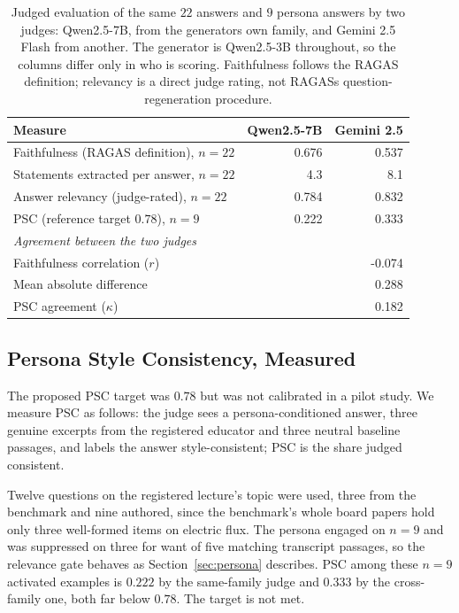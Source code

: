 \documentclass[conference]{IEEEtran}
\begin{document}
\begin{table}[htbp]
\caption{Judged evaluation of the same $22$ answers and $9$ persona answers by two judges: Qwen2.5-7B, from the generator\textquotesingle{}s own family, and Gemini 2.5 Flash from another. The generator is Qwen2.5-3B throughout, so the columns differ only in who is scoring. Faithfulness follows the RAGAS definition; relevancy is a direct judge rating, not RAGAS\textquotesingle{}s question-regeneration procedure.}
\label{tab:judged}
\centering
\begin{tabular}{lrr}
\toprule
\textbf{Measure} & \textbf{Qwen2.5-7B} & \textbf{Gemini 2.5} \\
\midrule
Faithfulness (RAGAS definition), $n=22$ & 0.676 & 0.537 \\
Statements extracted per answer, $n=22$ & 4.3 & 8.1 \\
Answer relevancy (judge-rated), $n=22$ & 0.784 & 0.832 \\
PSC (reference target $0.78$), $n=9$ & 0.222 & 0.333 \\
\midrule
\multicolumn{3}{l}{\emph{Agreement between the two judges}} \\
Faithfulness correlation ($r$) & \multicolumn{2}{r}{-0.074} \\
Mean absolute difference & \multicolumn{2}{r}{0.288} \\
PSC agreement ($\kappa$) & \multicolumn{2}{r}{0.182} \\
\bottomrule
\end{tabular}
\end{table}

\subsection{Persona Style Consistency, Measured}
\label{sec:pscval}
The proposed PSC target was $0.78$ but was not calibrated in a pilot study.
We measure PSC as follows: the judge sees a
persona-conditioned answer, three genuine excerpts from the registered educator
and three neutral baseline passages, and labels the answer style-consistent;
PSC is the share judged consistent.

Twelve questions on the registered lecture's topic were used, three from the
benchmark and nine authored, since the benchmark's whole board papers hold only
three well-formed items on electric flux. The persona engaged on $n=9$ and was
suppressed on three for want of five matching transcript passages, so the
relevance gate behaves as Section~\ref{sec:persona} describes. PSC among these $n=9$ activated examples is $0.222$
by the same-family judge and $0.333$ by the cross-family one, both far below
$0.78$. The target is not met.
\end{document}
